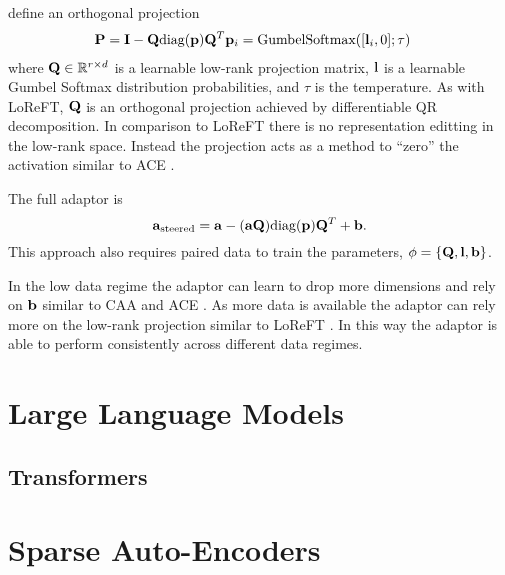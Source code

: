 \citet{steering-clear} define an orthogonal projection
\begin{align*}
    \mathbf{P} = \mathbf{I} - \mathbf{Q}\text{diag}(\mathbf{p})\mathbf{Q}^T & \mathbf{p}_i = \text{GumbelSoftmax}([\mathbf{l}_i,0];\tau)
\end{align*}
where $\mathbf{Q} \in \mathbb{R}^{r\times d}$ is a learnable low-rank projection matrix, $\mathbf{l}$ is a learnable Gumbel Softmax distribution probabilities, and $\tau$ is the temperature.
As with LoReFT, $\mathbf{Q}$ is an orthogonal projection achieved by differentiable QR decomposition.
In comparison to LoReFT  there is no representation editting in the low-rank space.
Instead the projection acts as a method to ``zero'' the activation similar to ACE \cite{ace}.

The full adaptor is
\begin{equation}
    \mathbf{a}_\text{steered} = \mathbf{a} - (\mathbf{a}\mathbf{Q})\text{diag}(\mathbf{p})\mathbf{Q}^T + \mathbf{b}.
\end{equation}
This approach also requires paired data to train the parameters, $\phi = \{\mathbf{Q}, \mathbf{l}, \mathbf{b}\}$.

In the low data regime the adaptor can learn to drop more dimensions and rely on $\mathbf{b}$ similar to CAA \cite{caa} and ACE \cite{ace}.
As more data is available the adaptor can rely more on the low-rank projection similar to LoReFT \cite{reft}.
In this way the adaptor is able to perform consistently across different data regimes.

\section{Large Language Models}

\subsection{Transformers}

\section{Sparse Auto-Encoders}
